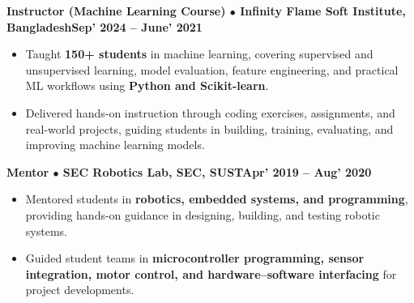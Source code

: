 \documentclass[10pt,letterpaper]{article}
\newcommand{\entry}[2]{\vspace{2pt}\par\noindent\textbf{#1}\hfill\textbf{#2}\par\nopagebreak}
\begin{document}
\entry{Instructor (Machine Learning Course) $\bullet$ Infinity Flame Soft Institute, Bangladesh}{Sep' 2024 -- June' 2021}
\begin{itemize}
  \item Taught \textbf{150+ students} in machine learning, covering supervised and unsupervised learning, model evaluation, feature engineering, and practical ML workflows using \textbf{Python and Scikit-learn}.
  \item Delivered hands-on instruction through coding exercises, assignments, and real-world projects, guiding students in building, training, evaluating, and improving machine learning models.
\end{itemize}

\entry{Mentor $\bullet$ SEC Robotics Lab, SEC, SUST}{Apr' 2019 -- Aug' 2020}
\begin{itemize}
  \item Mentored students in \textbf{robotics, embedded systems, and programming}, providing hands-on guidance in designing, building, and testing robotic systems.
  \item Guided student teams in \textbf{microcontroller programming, sensor integration, motor control, and hardware--software interfacing} for project developments.
\end{itemize}

\end{document}
